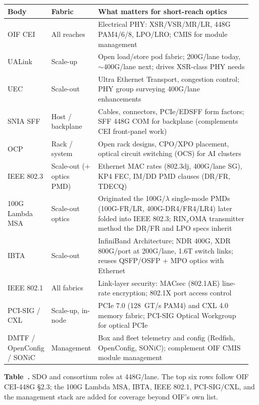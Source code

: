 \begin{table}[ht]
\label{tab:sdo-map}%
\centering
\setlength{\tabcolsep}{5pt}%
\footnotesize
\renewcommand{\arraystretch}{1.25}%
\begin{tabular}{@{}p{0.12\linewidth}p{0.14\linewidth}p{0.70\linewidth}@{}}
\toprule
Body & Fabric & What matters for short-reach optics \\
\midrule
OIF CEI & All reaches & Electrical PHY: XSR/VSR/MR/LR, 448G PAM4/6/8, LPO/LRO; CMIS for module management \\
\addlinespace[1.5em]
UALink & Scale-up & Open load/store pod fabric; 200G/lane today, $\sim$400G/lane next; drives XSR-class PHY needs \\
\addlinespace[1.5em]
UEC & Scale-out & Ultra Ethernet Transport, congestion control; PHY group surveying 400G/lane enhancements \\
\addlinespace[1.5em]
SNIA SFF & Host / backplane & Cables, connectors, PCIe/EDSFF form factors; SFF 448G COM for backplane (complements CEI front-panel work) \\
\addlinespace[1.5em]
OCP & Rack / system & Open rack designs, CPO/XPO placement, optical circuit switching (OCS) for AI clusters \\
\addlinespace[1.5em]
IEEE 802.3 & Scale-out (+ optics PMD) & Ethernet MAC rates (802.3dj, 400G/lane SG), KP4 FEC, IM/DD PMD clauses (DR/FR, TDECQ) \\
\addlinespace[1.5em]
100G Lambda MSA & Scale-out optics & Originated the 100G/$\lambda$ single-mode PMDs (100G-FR/LR, 400G-DR4/FR4/LR4) later folded into IEEE 802.3; RIN$_x$OMA transmitter method the DR/FR and LPO specs inherit \\
\addlinespace[1.5em]
IBTA & Scale-out & InfiniBand Architecture; NDR 400G, XDR 800G/port at 200G/lane, 1.6T switch links; reuses QSFP/OSFP + MPO optics with Ethernet \\
\addlinespace[1.5em]
IEEE 802.1 & All fabrics & Link-layer security: MACsec (802.1AE) line-rate encryption; 802.1X port access control \\
\addlinespace[1.5em]
PCI-SIG / CXL & Scale-up, in-node & PCIe 7.0 (128~GT/s PAM4) and CXL 4.0 memory fabric; PCI-SIG Optical Workgroup for optical PCIe \\
\addlinespace[1.5em]
DMTF / OpenConfig / SONiC & Management & Box and fleet telemetry and config (Redfish, OpenConfig, SONiC); complement OIF CMIS module management \\
\bottomrule
\end{tabular}
\par\medskip
{\raggedright\footnotesize\textbf{Table~\thetable.} SDO and consortium roles at 448G/lane.
The top six rows follow OIF CEI-448G \S2.3; the 100G Lambda MSA, IBTA, IEEE 802.1,
PCI-SIG/CXL, and the management stack are added for coverage beyond OIF's own list.\par}
\end{table}

